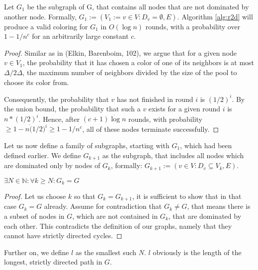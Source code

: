 \begin{theorem}
\label{theorem:r2dzeit}
	Let $G_1$ be the subgraph of G, that contains all nodes that are not dominated by another node. Formally, $G_1 := (V_1 := v \in V : D_v = \emptyset , E)$. Algorithm \ref{alg:r2d} will produce a valid coloring for $G_1$ in $O(\log n)$ rounds, with a probability over $1-1/n^c$ for an arbitrarily large constant $c$.
\end{theorem}
\begin{proof}
	Similar as in (Elkin, Barenboim, 102), we argue that for a given node $v \in V_1$, the probability that it has chosen a color of one of its neighbors is at most $\Delta / 2\Delta$, the maximum number of neighbors divided by the size of the pool to choose its color from.
	
	Consequently, the probability that $v$ has not finished in round $i$ is $(1/2)^i$. By the union bound, the probability that such a $v$ exists for a given round $i$ is $n * (1/2)^i$. Hence, after $(c+1) \dot \log n$ rounds, with probability $\geq 1-n \dot (1/2)^i \geq 1-1/n^c$, all of these nodes terminate successfully.
\end{proof}

Let us now define a family of subgraphs, starting with $G_1$, which had been defined earlier. We define $G_{k+1}$ as the subgraph, that includes all nodes which are dominated only by nodes of $G_k$, formally: $G_{k+1} := (v \in V : D_v \subseteq V_k, E)$.

\begin{theorem}
\label{theorem:r2dlaenge}
	$\exists N \in  \mathbb{N} : \forall k \geq N : G_k = G$
\end{theorem}
\begin{proof}
	Let us choose $k$ so that $G_k = G_{k+1}$, it is sufficient to show that in that case $G_k = G$ already.
	Assume for contradiction that $G_k \neq G$, that means there is a subset of nodes in $G$, which are not contained in $G_k$, that are dominated by each other.
	This contradicts the definition of our graphs, namely that they cannot have strictly directed cycles.
\end{proof}
Further on, we define $l$ as the smallest such $N$. $l$ obviously is the length of the longest, strictly directed path in $G$.


